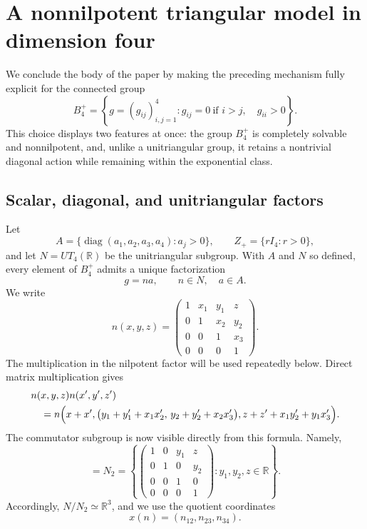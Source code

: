 \documentclass[reqno]{amsart}
\numberwithin{equation}{section}
\theoremstyle{definition}
\theoremstyle{remark}
\newcommand{\R}{\mathbb R}
\begin{document}
\section{A nonnilpotent triangular model in dimension four}
\label{sec:B4-model}

We conclude the body of the paper by making the preceding mechanism fully
explicit for the connected group
\[
 B_4^+
 =
 \left\{
 g=(g_{ij})_{i,j=1}^4:
 g_{ij}=0\ \text{if }i>j,\quad g_{ii}>0
 \right\}.
\]
This choice displays two features at once: the group $B_4^+$ is completely
solvable and nonnilpotent, and, unlike a unitriangular group, it retains a
nontrivial diagonal action while remaining within the exponential
class.

\subsection{Scalar, diagonal, and unitriangular factors}

Let
\[
 A=\{\operatorname{diag}(a_1,a_2,a_3,a_4):a_j>0\},
 \qquad
 Z_+=\{rI_4:r>0\},
\]
and let $N=UT_4(\R)$ be the unitriangular subgroup.  With $A$ and $N$ so
defined, every element of $B_4^+$ admits a unique factorization
\[
 g=na,\qquad n\in N,\quad a\in A.
\]
We write
\[
 n(x,y,z)=
 \begin{pmatrix}
 1&x_1&y_1&z\\
 0&1&x_2&y_2\\
 0&0&1&x_3\\
 0&0&0&1
 \end{pmatrix}.
\]
The multiplication in the nilpotent factor will be used repeatedly below.
Direct matrix multiplication gives
\begin{align}
 &n(x,y,z)n(x',y',z') \notag\\
 &\quad =
 n\Bigl(
 x+x',
 \bigl(y_1+y_1'+x_1x_2',\,y_2+y_2'+x_2x_3'\bigr),
 z+z'+x_1y_2'+y_1x_3'
 \Bigr).
 \label{eq:B4-N-law}
\end{align}
The commutator subgroup is now visible directly from this formula.  Namely,
\begin{equation}
 [N,N]
 =N_2
 =\left\{
 \begin{pmatrix}
 1&0&y_1&z\\
 0&1&0&y_2\\
 0&0&1&0\\
 0&0&0&1
 \end{pmatrix}
 :y_1,y_2,z\in\R
 \right\}.
 \label{eq:B4-N2}
\end{equation}
Accordingly, $N/N_2\simeq\R^3$, and we use the quotient coordinates
\[
 x(n)=(n_{12},n_{23},n_{34}).
\]
\end{document}
